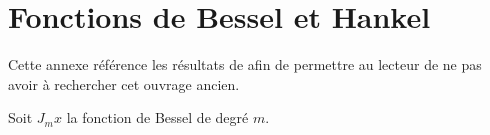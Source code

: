 \section{Fonctions de Bessel et Hankel}

Cette annexe référence les résultats de \cite{abramowitz_handbook_1964} afin de permettre au lecteur de ne pas avoir à rechercher cet ouvrage ancien.

Soit $J_m{x}$ la fonction de Bessel de degré $m$.
